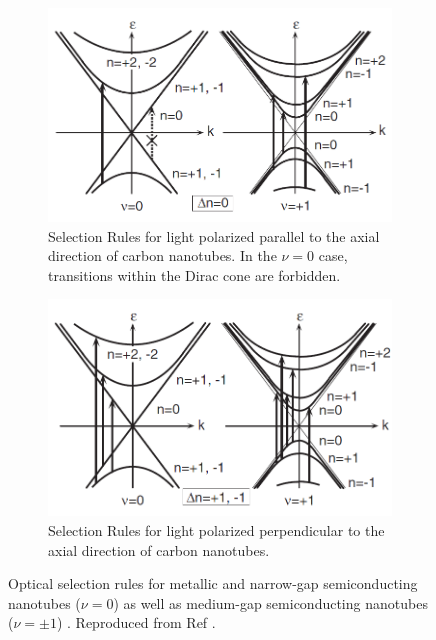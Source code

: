 \begin{figure}[H]
	\centering
	\begin{subfigure}{\textwidth}
		\centering
		\includegraphics[scale=0.65]{images/chapter_optical_props/selection_rules_1.png}
		\caption{Selection Rules for light polarized parallel to the axial direction of carbon nanotubes. In the $\nu=0$ case, transitions within the Dirac cone are forbidden.}
	\end{subfigure}
	\begin{subfigure}{\textwidth}
		\centering
		\includegraphics[scale=0.65]{images/chapter_optical_props/selection_rules_2.png}
		\caption{Selection Rules for light polarized perpendicular to the axial direction of carbon nanotubes.}
	\end{subfigure}
	\caption{Optical selection rules for metallic and narrow-gap semiconducting nanotubes ($\nu = 0 $) as well as medium-gap semiconducting nanotubes ($\nu = \pm 1$) . Reproduced from Ref \cite{ando2005theory}.}
	\label{fig:selection_rules}
\end{figure}


